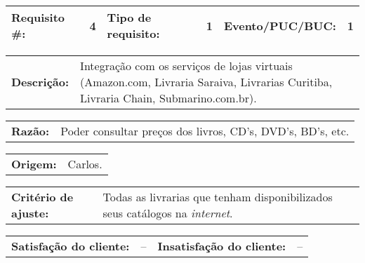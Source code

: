 
\par \noindent
\begin{table}[h]
    \begin{tabularx}{\textwidth}{
        p{}
        p{}
        p{}
        p{}
        p{}
        p{}
    }
    \toprule
        \textbf{Requisito \#:}          & 4
        & \textbf{Tipo de requisito:}   & 1
        & \textbf{Evento/PUC/BUC:}      & 1 \\
    \midrule
    \end{tabularx}
    \vspace{5pt}
    \begin{tabularx}{\textwidth}{p{}  p{}}
        \textbf{Descrição:} &
        Integração com os serviços de lojas virtuais (Amazon.com, 
        Livraria Saraiva, Livrarias Curitiba, Livraria Chain, 
        Submarino.com.br).
    \end{tabularx}
    
    \vspace{5pt}
    \begin{tabularx}{\textwidth}{p{}  p{}}
        \textbf{Razão:} &
        Poder consultar preços dos livros, CD's, DVD's, BD's, etc.
    \end{tabularx}
    
    \vspace{5pt}
    \begin{tabularx}{\textwidth}{p{} p{}}
        \textbf{Origem:} &
        Carlos.
    \end{tabularx}
    
    \vspace{5pt}
    \begin{tabularx}{\textwidth}{p{} p{}}
        \textbf{Critério de ajuste:} &
        Todas as livrarias que tenham disponibilizados seus 
        catálogos na \emph{internet}.
    \end{tabularx}
    
    \vspace{5pt}
    \begin{tabularx}{\textwidth}{p{}p{}
                                 p{}p{}}
        \textbf{Satisfação do cliente:} & -- & 
        \textbf{Insatisfação do cliente:} & --
    \end{tabularx}
    

\end{table}
